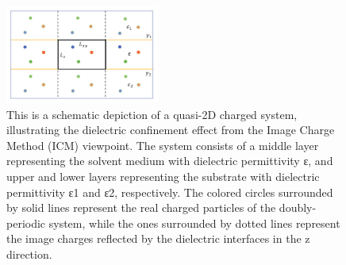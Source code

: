 \documentclass[aps,prl,reprint,showpacs,floatfix,superscriptaddress]{revtex4-2}
\newcommand{\abs}[1]{\left|#1\right|} %
\newcommand{\eps}{\epsilon}
\begin{document}
\begin{figure}[htbp]
	\centering
	\includegraphics[width=0.45\textwidth]{figs/fig1.pdf}
	\caption{
		This is a schematic depiction of a quasi-2D charged system, illustrating the dielectric confinement effect from the Image Charge Method (ICM) viewpoint. 
        The system consists of a middle layer representing the solvent medium with dielectric permittivity ε, and upper and lower layers representing the substrate with dielectric permittivity ε1 and ε2, respectively. 
        The colored circles surrounded by solid lines represent the real charged particles of the doubly-periodic system, while the ones surrounded by dotted lines represent the image charges reflected by the dielectric interfaces in the z direction.
		\label{fig:ICM}
	}
\end{figure}


\end{document}
